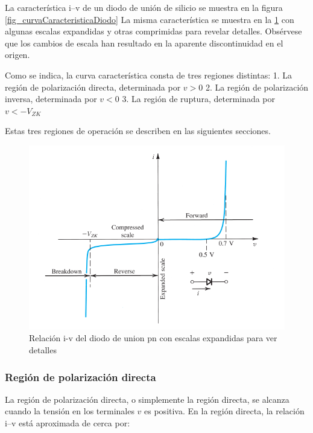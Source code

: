 La característica i–v de un diodo de unión de silicio se muestra en la figura \ref{fig_curvaCaracteristicaDiodo} La misma característica se muestra en la \ref{fig_curvaCaracteristicaDiodoExp} con algunas escalas expandidas y otras comprimidas para revelar detalles. Obsérvese que los cambios de escala han resultado en la aparente discontinuidad en el origen.

Como se indica, la curva característica consta de tres regiones distintas:
1. La región de polarización directa, determinada por \( v > 0 \)
2. La región de polarización inversa, determinada por \( v < 0 \)
3. La región de ruptura, determinada por \( v < -V_{ZK} \)

Estas tres regiones de operación se describen en las siguientes secciones.

\begin{figure}[H]
    \centering
    \includegraphics[scale=0.6]{Electronica/diodo_f4.png}
    \caption{Relación i-v del diodo de union pn con escalas expandidas para ver detalles}
    \label{fig_curvaCaracteristicaDiodoExp}
\end{figure}

\subsubsection{Región de polarización directa}





La región de polarización directa, o simplemente la región directa, se alcanza cuando la tensión en los terminales \( v \) es positiva. En la región directa, la relación i–v está aproximada de cerca por:


